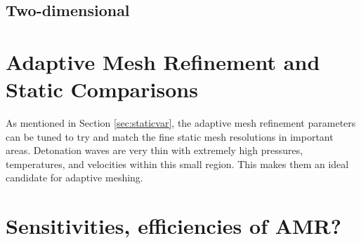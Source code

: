 \subsection{Two-dimensional}
\section{Adaptive Mesh Refinement and Static Comparisons}
As mentioned in Section \ref{sec:staticvar}, the adaptive mesh refinement parameters can be tuned to try and match the fine static mesh resolutions in important areas. Detonation waves are very thin with extremely high pressures, temperatures, and velocities within this small region. This makes them an ideal candidate for adaptive meshing. 



\section{Sensitivities, efficiencies of AMR?}